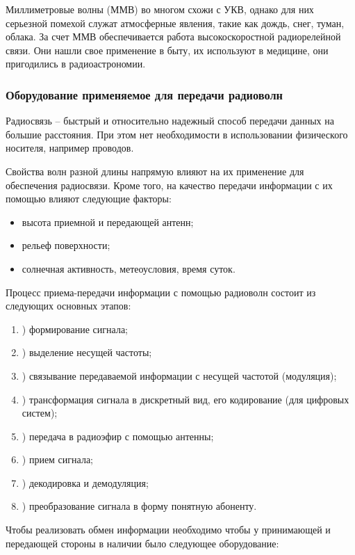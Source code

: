\documentclass[a4paper]{report}
\begin{document}
Миллиметровые волны (ММВ) во многом схожи с УКВ, однако для них серьезной помехой служат атмосферные явления, такие как дождь, снег, туман, облака. За счет ММВ обеспечивается работа высокоскоростной радиорелейной связи. Они нашли свое применение в быту, их используют в медицине, они пригодились в радиоастрономии.

\subsubsection{Оборудование применяемое для передачи радиоволн}

Радиосвязь – быстрый и относительно надежный способ передачи данных на большие расстояния. При этом нет необходимости в использовании физического носителя, например проводов.

Свойства волн разной длины напрямую влияют на их применение для обеспечения радиосвязи. Кроме того, на качество передачи информации с их помощью влияют следующие факторы:

\begin{itemize}
\item высота приемной и передающей антенн;
\item рельеф поверхности;
\item солнечная активность, метеоусловия, время суток.
\end{itemize}

Процесс приема-передачи информации с помощью радиоволн состоит из следующих основных этапов:

\begin{enumerate}

\item) формирование сигнала;
\item) выделение несущей частоты;
\item) связывание передаваемой информации с несущей частотой (модуляция);
\item) трансформация сигнала в дискретный вид, его кодирование (для цифровых систем);
\item) передача в радиоэфир с помощью антенны;
\item) прием сигнала;
\item) декодировка и демодуляция;
\item) преобразование сигнала в форму понятную абоненту.
\end{enumerate}

Чтобы реализовать обмен информации необходимо чтобы у принимающей и передающей стороны в наличии было следующее оборудование:
\end{document}
